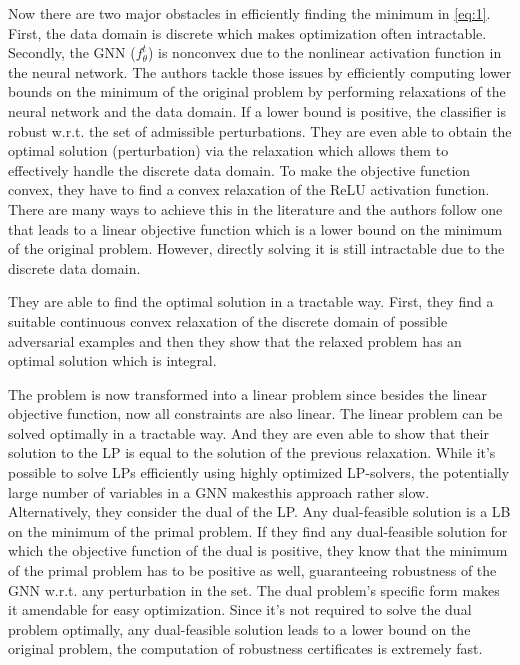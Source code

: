 \documentclass[a4paper,preprint]{sig-alternate}
\begin{document}
Now there are two major obstacles in efficiently finding the minimum in \ref{eq:1}.
First, the data domain is discrete which makes optimization often intractable. Secondly, the GNN ($f_{\theta}^t$) is nonconvex
due to the nonlinear activation function in the neural network. The authors tackle those issues by efficiently computing lower bounds
on the minimum of the original problem by performing relaxations of the neural network and the data domain.
If a lower bound is positive, the classifier is robust w.r.t. the set of admissible perturbations.
They are even able to obtain the optimal solution (perturbation) via the relaxation which allows them to effectively handle the discrete data domain.
To make the objective function convex, they have to find a convex relaxation of the ReLU activation function. There are many ways to achieve this
in the literature and the authors follow one that leads to a linear objective function which is a lower bound on the minimum of the original problem.
However, directly solving it is still intractable due to the discrete data domain.

They are able to find the optimal solution in a tractable way. First, they find a suitable continuous convex relaxation of the discrete domain
of possible adversarial examples and then they show that the relaxed problem has an optimal solution which is integral.

\vfill
\pagebreak

The problem is now transformed into a linear problem since besides the linear objective function, now all constraints are also linear.
The linear problem can be solved optimally in a tractable way. And they are even able to show that their solution to the LP is equal to
the solution of the previous relaxation. While it's possible to solve LPs efficiently using highly optimized LP-solvers, the potentially 
large number of variables in a GNN makesthis approach rather slow. Alternatively, they consider the dual of the LP. Any dual-feasible solution 
is a LB on the minimum of the primal problem. If they find any dual-feasible solution for which the objective function of the dual is positive,
they know that the minimum of the primal problem has to be positive as well, guaranteeing robustness of the GNN w.r.t. any perturbation in the set.
The dual problem's specific form makes it amendable for easy optimization. Since it's not required to solve the dual problem optimally, 
any dual-feasible solution leads to a lower bound on the original problem, the computation of robustness certificates is extremely fast.\newline
\end{document}
